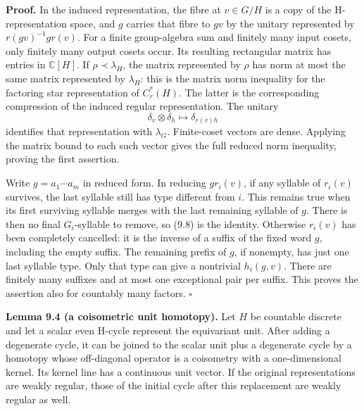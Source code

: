 \documentclass[
  11pt,
]{article}
\begin{document}
\textbf{Proof.} In the induced representation, the fibre at \(v\in G/H\)
is a copy of the H-representation space, and \(g\) carries that fibre to
\(gv\) by the unitary represented by \(r(gv)^{-1}gr(v)\). For a finite
group-algebra sum and finitely many input cosets, only finitely many
output cosets occur. Its resulting rectangular matrix has entries in
\(\mathbb C[H]\). If \(\rho\prec\lambda_H\), the matrix represented by
\(\rho\) has norm at most the same matrix represented by \(\lambda_H\):
this is the matrix norm inequality for the factoring star representation
of \(C_r^*(H)\). The latter is the corresponding compression of the
induced regular representation. The unitary \[
\delta_v\otimes\delta_h\longmapsto\delta_{r(v)h}
\tag{9.9}
\] identifies that representation with \(\lambda_G\). Finite-coset
vectors are dense. Applying the matrix bound to each such vector gives
the full reduced norm inequality, proving the first assertion.

Write \(g=a_1\cdots a_m\) in reduced form. In reducing \(g r_i(v)\), if
any syllable of \(r_i(v)\) survives, the last syllable still has type
different from \(i\). This remains true when its first surviving
syllable merges with the last remaining syllable of \(g\). There is then
no final \(G_i\)-syllable to remove, so (9.8) is the identity. Otherwise
\(r_i(v)\) has been completely cancelled: it is the inverse of a suffix
of the fixed word \(g\), including the empty suffix. The remaining
prefix of \(g\), if nonempty, has just one last syllable type. Only that
type can give a nontrivial \(h_i(g,v)\). There are finitely many
suffixes and at most one exceptional pair per suffix. This proves the
assertion also for countably many factors. \(\square\)

\textbf{Lemma 9.4 (a coisometric unit homotopy).} Let \(H\) be countable
discrete and let a scalar even H-cycle represent the equivariant unit.
After adding a degenerate cycle, it can be joined to the scalar unit
plus a degenerate cycle by a homotopy whose off-diagonal operator is a
coisometry with a one-dimensional kernel. Its kernel line has a
continuous unit vector. If the original representations are weakly
regular, those of the initial cycle after this replacement are weakly
regular as well.
\end{document}
